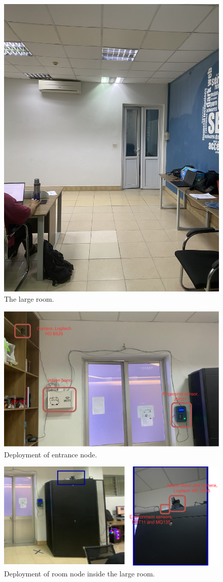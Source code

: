 \documentclass[../main.tex]{subfiles}
\begin{document}
\begin{figure}[h!]
\centering
\includegraphics[width=0.6\linewidth]{Figure/large_room.jpg}
\caption{The large room.}
\label{fig:large_room}
\end{figure}

\begin{figure}[h!]
\centering
\includegraphics[width=\linewidth]{Figure/edge_door.pdf}
\caption{Deployment of entrance node.}
\label{fig:edge_door}
\end{figure}

\begin{figure}[h!]
\centering
\includegraphics[width=\linewidth]{Figure/edge_largeroom.pdf}
\caption{Deployment of room node inside the large room.}
\label{fig:edge_largeroom}
\end{figure}
\end{document}
